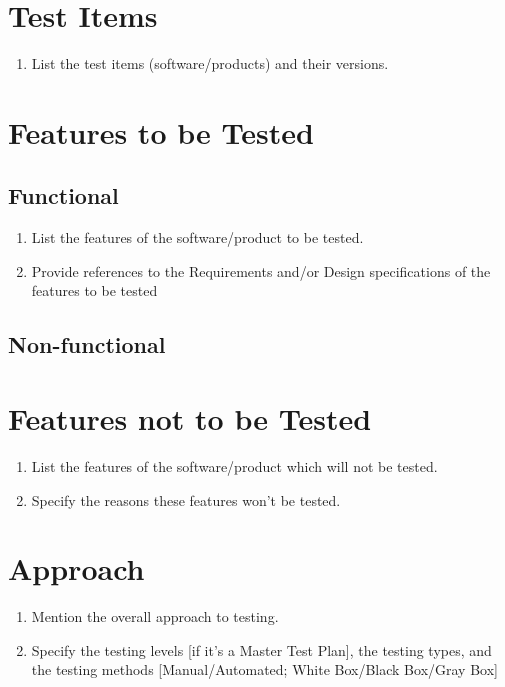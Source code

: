 \section{Test Items}

\begin{enumerate}
	\item List the test items (software/products) and their versions.
\end{enumerate}

\section{Features to be Tested}

\subsection{Functional}
\begin{enumerate}
	\item List the features of the software/product to be tested.
	\item Provide references to the Requirements and/or Design specifications of the features to be tested
\end{enumerate}
\subsection{Non-functional}     

\section{Features not to be Tested}

\begin{enumerate}
	\item List the features of the software/product which will not be tested.
	\item Specify the reasons these features won’t be tested.
\end{enumerate}

\section{Approach}

\begin{enumerate}
	\item Mention the overall approach to testing.
	\item Specify the testing levels [if it’s a Master Test Plan], the testing types, and the testing methods [Manual/Automated; White Box/Black Box/Gray Box]
\end{enumerate}

